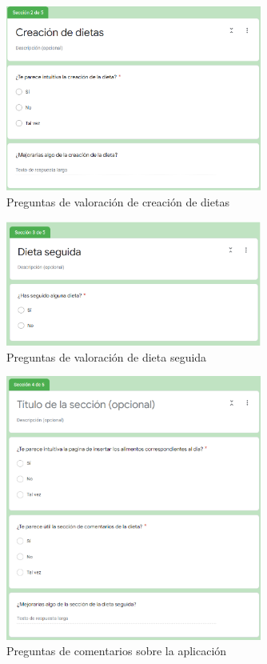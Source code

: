 \begin{figure}[H]
    \centering
    \includegraphics[width=0.75\textwidth]{Images/Capitulo8/Capitulo8.1/val2.png}
    \caption{Preguntas de valoración de creación de dietas}
    \label{fig:preguntas_form_2}
\end{figure}

\begin{figure}[H]
    \centering
    \includegraphics[width=0.75\textwidth]{Images/Capitulo8/Capitulo8.1/val3.png}
    \caption{Preguntas de valoración de dieta seguida}
    \label{fig:preguntas_form_3}
\end{figure}

\begin{figure}[H]
    \centering
    \includegraphics[width=0.75\textwidth]{Images/Capitulo8/Capitulo8.1/val4.png}
    \caption{Preguntas de comentarios sobre la aplicación}
    \label{fig:preguntas_form_4}
\end{figure}

